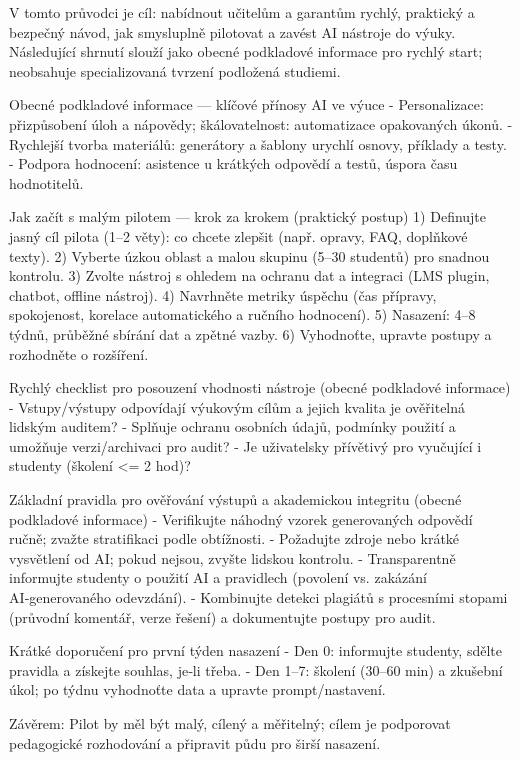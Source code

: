 V tomto průvodci je cíl: nabídnout učitelům a garantům rychlý, praktický a bezpečný návod, jak smysluplně pilotovat a zavést AI nástroje do výuky.
Následující shrnutí slouží jako obecné podkladové informace pro rychlý start; neobsahuje specializovaná tvrzení podložená studiemi.

Obecné podkladové informace — klíčové přínosy AI ve výuce
- Personalizace: přizpůsobení úloh a nápovědy; škálovatelnost: automatizace opakovaných úkonů.
- Rychlejší tvorba materiálů: generátory a šablony urychlí osnovy, příklady a testy.
- Podpora hodnocení: asistence u krátkých odpovědí a testů, úspora času hodnotitelů.

Jak začít s malým pilotem — krok za krokem (praktický postup)
1) Definujte jasný cíl pilota (1–2 věty): co chcete zlepšit (např. opravy, FAQ, doplňkové texty).
2) Vyberte úzkou oblast a malou skupinu (5–30 studentů) pro snadnou kontrolu.
3) Zvolte nástroj s ohledem na ochranu dat a integraci (LMS plugin, chatbot, offline nástroj).
4) Navrhněte metriky úspěchu (čas přípravy, spokojenost, korelace automatického a ručního hodnocení).
5) Nasazení: 4–8 týdnů, průběžné sbírání dat a zpětné vazby.
6) Vyhodnoťte, upravte postupy a rozhodněte o rozšíření.

Rychlý checklist pro posouzení vhodnosti nástroje (obecné podkladové informace)
- Vstupy/výstupy odpovídají výukovým cílům a jejich kvalita je ověřitelná lidským auditem?
- Splňuje ochranu osobních údajů, podmínky použití a umožňuje verzi/archivaci pro audit?
- Je uživatelsky přívětivý pro vyučující i studenty (školení <= 2 hod)?

Základní pravidla pro ověřování výstupů a akademickou integritu (obecné podkladové informace)
- Verifikujte náhodný vzorek generovaných odpovědí ručně; zvažte stratifikaci podle obtížnosti.
- Požadujte zdroje nebo krátké vysvětlení od AI; pokud nejsou, zvyšte lidskou kontrolu.
- Transparentně informujte studenty o použití AI a pravidlech (povolení vs. zakázání AI‑generovaného odevzdání).
- Kombinujte detekci plagiátů s procesními stopami (průvodní komentář, verze řešení) a dokumentujte postupy pro audit.

Krátké doporučení pro první týden nasazení
- Den 0: informujte studenty, sdělte pravidla a získejte souhlas, je‑li třeba.
- Den 1–7: školení (30–60 min) a zkušební úkol; po týdnu vyhodnoťte data a upravte prompt/nastavení.

Závěrem: Pilot by měl být malý, cílený a měřitelný; cílem je podporovat pedagogické rozhodování a připravit půdu pro širší nasazení.